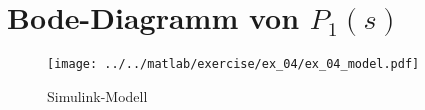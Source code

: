 \section{Bode-Diagramm von $P_1(s)$}
\begin{figure}[h!]
	\centering
	\texttt{[image: ../../matlab/exercise/ex\_04/ex\_04\_model.pdf]}
	\caption{Simulink-Modell}
\end{figure}
